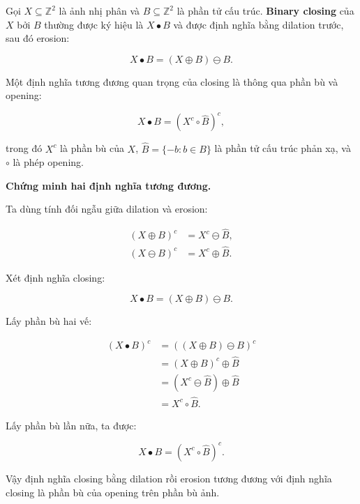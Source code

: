 Gọi $X \subseteq \mathbb{Z}^2$ là ảnh nhị phân và $B \subseteq \mathbb{Z}^2$ là phần tử cấu trúc. \textbf{Binary closing} của $X$ bởi $B$ thường được ký hiệu là $X\bullet B$ và được định nghĩa bằng dilation trước, sau đó erosion:

\begin{equation}
    X\bullet B = (X\oplus B)\ominus B.
\end{equation}

Một định nghĩa tương đương quan trọng của closing là thông qua phần bù và opening:

\begin{equation}
    X\bullet B = \left(X^c \circ \hat{B}\right)^c,
\end{equation}

trong đó $X^c$ là phần bù của $X$, $\hat{B}=\{-b:b\in B\}$ là phần tử cấu trúc phản xạ, và $\circ$ là phép opening.

\textbf{Chứng minh hai định nghĩa tương đương.}

Ta dùng tính đối ngẫu giữa dilation và erosion:

\begin{align}
    (X\oplus B)^c &= X^c \ominus \hat{B}, \\
    (X\ominus B)^c &= X^c \oplus \hat{B}.
\end{align}

Xét định nghĩa closing:

\begin{equation}
    X\bullet B = (X\oplus B)\ominus B.
\end{equation}

Lấy phần bù hai vế:

\begin{align}
    (X\bullet B)^c
    &= \left((X\oplus B)\ominus B\right)^c \\
    &= (X\oplus B)^c \oplus \hat{B} \\
    &= (X^c\ominus \hat{B})\oplus \hat{B} \\
    &= X^c \circ \hat{B}.
\end{align}

Lấy phần bù lần nữa, ta được:

\begin{equation}
    X\bullet B = \left(X^c \circ \hat{B}\right)^c.
\end{equation}

Vậy định nghĩa closing bằng dilation rồi erosion tương đương với định nghĩa closing là phần bù của opening trên phần bù ảnh.


